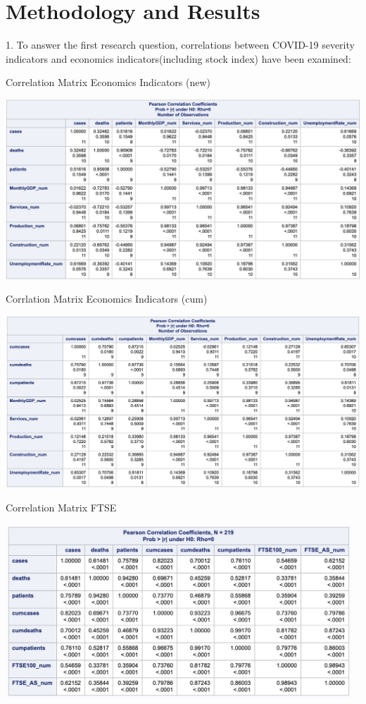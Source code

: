 \documentclass[12pt, a4paper]{report}
\begin{document}
\section{Methodology and Results}
1. To answer the first research question, correlations between COVID-19 severity indicators
and economics indicators(including stock index) have been examined:

\begin{table}[H]
\centering
\caption{Correlation Matrix Economics Indicators (new)}
\includegraphics[width=15cm]{corr_economics_new.jpg}
\end{table}

\begin{table}[H]
\centering
\caption{Corrlation Matrix Economics Indicators (cum)}
\includegraphics[width=15cm]{corr_economics_cum.jpg}
\end{table}

\begin{table}[H]
\centering
\caption{Correlation Matrix FTSE}
\includegraphics[width=13cm]{corr_stock.jpg}
\end{table}
\end{document}
